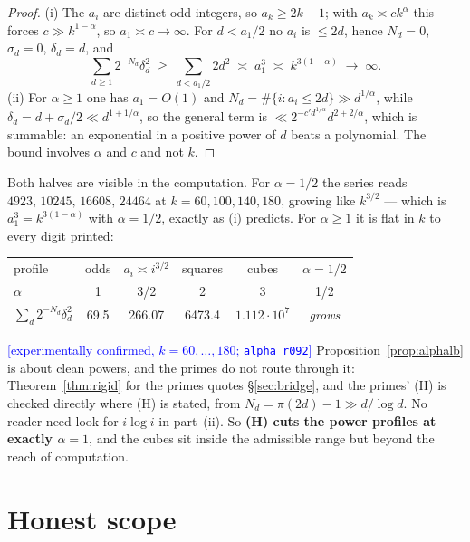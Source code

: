\documentclass[11pt,a4paper]{article}
\theoremstyle{plain}
\theoremstyle{definition}
\theoremstyle{remark}
\newcommand{\STATUS}[1]{\textcolor{blue}{\textsf{[#1]}}}
\begin{document}
\begin{proof}
(i) The $a_i$ are distinct odd integers, so $a_k\ge2k-1$; with $a_k\asymp ck^{\alpha}$ this
forces $c\gg k^{1-\alpha}$, so $a_1\asymp c\to\infty$. For $d<a_1/2$ no $a_i$ is $\le2d$, hence
$N_d=0$, $\sigma_d=0$, $\delta_d=d$, and
\[
  \sum_{d\ge1}2^{-N_d}\delta_d^{2}\;\ge\;\sum_{d<a_1/2}2d^{2}\;\asymp\;a_1^{3}
  \;\asymp\;k^{3(1-\alpha)}\;\longrightarrow\;\infty .
\]
(ii) For $\alpha\ge1$ one has $a_1=O(1)$ and $N_d=\#\{i:a_i\le2d\}\gg d^{1/\alpha}$, while
$\delta_d=d+\sigma_d/2\ll d^{1+1/\alpha}$, so the general term is
$\ll2^{-c'd^{1/\alpha}}d^{2+2/\alpha}$, which is summable: an exponential in a positive power
of $d$ beats a polynomial. The bound involves $\alpha$ and $c$ and not $k$.
\end{proof}

\noindent
Both halves are visible in the computation. For $\alpha=1/2$ the series reads
$4923,\,10245,\,16608,\,24464$ at $k=60,100,140,180$, growing like $k^{3/2}$ --- which is
$a_1^{3}=k^{3(1-\alpha)}$ with $\alpha=1/2$, exactly as (i) predicts. For $\alpha\ge1$ it is
flat in $k$ to every digit printed:

\begin{center}
\begin{tabular}{lccccc}
\toprule
profile & odds & $a_i\asymp i^{3/2}$ & squares & cubes & $\alpha=1/2$\\
$\alpha$ & 1 & 3/2 & 2 & 3 & 1/2\\
\midrule
$\sum_d2^{-N_d}\delta_d^2$ & 69.5 & 266.07 & 6473.4 & $1.112\cdot10^{7}$ & \emph{grows}\\
\bottomrule
\end{tabular}
\end{center}

\noindent
\STATUS{experimentally confirmed, $k=60,\dots,180$; \texttt{alpha\_r092}}
Proposition~\ref{prop:alphalb} is about clean powers, and the primes do not route through it:
Theorem~\ref{thm:rigid} for the primes quotes \S\ref{sec:bridge}, and the primes'
\textup{(H)} is checked directly where \textup{(H)} is stated, from
$N_d=\pi(2d)-1\gg d/\log d$. No reader need look for $i\log i$ in part~(ii).
So \textbf{(H) cuts the power profiles at exactly $\alpha=1$}, and the cubes sit inside the
admissible range but beyond the reach of computation.

\section{Honest scope}\label{sec:scope}
\end{document}
